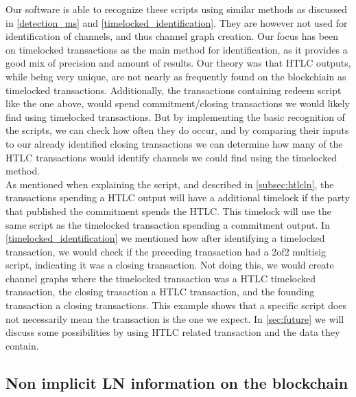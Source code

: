 Our software is able to recognize these scripts using similar methods as discussed in \cref{detection_ms} and \cref{timelocked_identification}. 
They are however not used for identification of channels, and thus channel graph creation. Our focus has been on timelocked transactions as the main method for identification, as it provides a good mix of precision and amount of results. Our theory was that HTLC outputs, while being very unique, are not nearly as frequently found on the blockchiain as timelocked transactions. Additionally, the transactions containing redeem script like the one above, would spend commitment/closing transactions we would likely find using timelocked transactions.
But by implementing the basic recognition of the scripts, we can check how often they do occur, and by comparing their inputs to our already identified closing transactions we can determine how many of the HTLC transactions would identify channels we could find using the timelocked method.
\\

As mentioned when explaining the script, and described in \cref{subsec:htlcln}, the transactions spending a HTLC output will have a additional timelock if the party that published the commitment spends the HTLC. This timelock will use the same script as the timelocked transaction spending a commitment output. In \cref{timelocked_identification} we mentioned how after identifying a timelocked transaction, we would check if the preceding transaction had a 2of2 multisig script, indicating it was a closing transaction. Not doing this, we would create channel graphs where the timelocked transaction was a HTLC timelocked transaction, the closing trasaction a HTLC transaction, and the founding transaction a closing transactions. This example shows that a specific script does not necessarily mean the transaction is the one we expect. In \cref{sec:future} we will discuss some possibilities by using HTLC related transaction and the data they contain.



\subsection{Non implicit LN information on the blockchain}
\label{subsec:information_ln}

